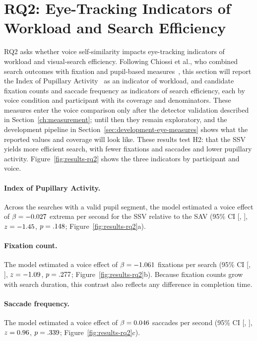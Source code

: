 \section{RQ2: Eye-Tracking Indicators of Workload and Search Efficiency}
RQ2 asks whether voice self-similarity impacts eye-tracking indicators of workload and visual-search efficiency. Following Chiossi et al., who combined search outcomes with fixation and pupil-based measures~\cite{chiossi2024searching}, this section will report the Index of Pupillary Activity~\cite{duchowski2018ipa} as an indicator of workload, and candidate fixation counts and saccade frequency as indicators of search efficiency, each by voice condition and participant with its coverage and denominators. These measures enter the voice comparison only after the detector validation described in Section~\ref{ch:measurement}; until then they remain exploratory, and the development pipeline in Section~\ref{sec:development-eye-measures} shows what the reported values and coverage will look like. These results test H2: that the SSV yields more efficient search, with fewer fixations and saccades and lower pupillary activity. Figure~\ref{fig:results-rq2} shows the three indicators by participant and voice.

\paragraph{Index of Pupillary Activity.} Across the \resIpaObs{} searches with a valid pupil segment, the model estimated a voice effect of $\beta = -0.027$ extrema per second for the SSV relative to the SAV (95\% CI [\resIpaLo, \resIpaHi], $z = -1.45$, $p = .148$; Figure~\ref{fig:results-rq2}a).

\paragraph{Fixation count.} The model estimated a voice effect of $\beta = -1.061$ fixations per search (95\% CI [\resFixLo, \resFixHi], $z = -1.09$, $p = .277$; Figure~\ref{fig:results-rq2}b). Because fixation counts grow with search duration, this contrast also reflects any difference in completion time.

\paragraph{Saccade frequency.} The model estimated a voice effect of $\beta = 0.046$ saccades per second (95\% CI [\resSaccLo, \resSaccHi], $z = 0.96$, $p = .339$; Figure~\ref{fig:results-rq2}c).

